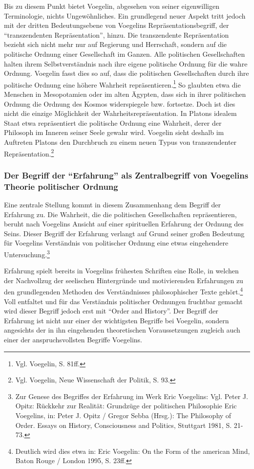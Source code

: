Bis zu diesem Punkt bietet Voegelin, abgesehen von seiner eigenwilligen
Terminologie, nichts Ungewöhnliches. Ein grundlegend neuer Aspekt tritt jedoch
mit der dritten Bedeutungsebene von Voegelins Repräsentationsbegriff, der
"`transzendenten Repräsentation"', hinzu. Die transzendente Repräsentation
bezieht sich nicht mehr nur auf Regierung und Herrschaft, sondern auf die
politische Ordnung einer Gesellschaft im Ganzen. Alle politischen
Gesellschaften halten ihrem Selbstverständnis nach ihre eigene politische
Ordnung für die wahre Ordnung. Voegelin fasst dies so auf, dass die
politischen Gesellschaften durch ihre politische Ordnung eine höhere Wahrheit
repräsentieren.\footnote{Vgl.  Voegelin, S. 81ff.} So glaubten etwa die
Menschen in Mesopotamien oder im alten Ägypten, dass sich in ihrer politischen
Ordnung die Ordnung des Kosmos widerspiegele bzw. fortsetze. Doch ist dies
nicht die einzige Möglichkeit der Wahrheitsrepräsentation. In Platons idealem
Staat etwa repräsentiert die politische Ordnung eine Wahrheit, derer der
Philosoph im Inneren seiner Seele gewahr wird. Voegelin sieht deshalb im
Auftreten Platons den Durchbruch zu einem neuen Typus von transzendenter
Repräsentation.\footnote{Vgl. Voegelin, Neue Wissenschaft der Politik, S. 93.}

\subsubsection{Der Begriff der "`Erfahrung"' als Zentralbegriff von Voegelins
  Theorie politischer Ordnung}

Eine zentrale Stellung kommt in diesem Zusammenhang dem Begriff der Erfahrung
zu. Die Wahrheit, die die politischen Gesellschaften repräsentieren, beruht
nach Voegelins Ansicht auf einer spirituellen Erfahrung der Ordnung des Seins.
Dieser Begriff der Erfahrung verlangt auf Grund seiner großen Bedeutung für
Voegelins Verständnis von politischer Ordnung eine etwas eingehendere
Untersuchung.\footnote{Zur Genese des Begriffes der Erfahrung im Werk Eric
  Voegelins: Vgl. Peter J. Opitz: Rückkehr zur Realität: Grundzüge der
  politischen Philosophie Eric Voegelins, in: Peter J.  Opitz /
  Gregor Sebba (Hrsg.): The Philosophy of Order. Essays on History,
  Consciousness and Politics, Stuttgart 1981, S. 21-73.}

Erfahrung spielt bereits in Voegelins frühesten Schriften eine Rolle, in
welchen der Nachvollzug der seelischen Hintergründe und motivierenden
Erfahrungen zu den grundlegenden Methoden des Verständnisses philosophischer
Texte gehört.\footnote{Deutlich wird dies etwa in: Eric Voegelin: On the Form
  of the american Mind, Baton Rouge / London 1995, S. 23ff.} Voll entfaltet
und für das Verständnis politischer Ordnungen fruchtbar gemacht wird dieser
Begriff jedoch erst mit "`Order and History"'. Der Begriff der Erfahrung ist
nicht nur einer der wichtigsten Begriffe bei Voegelin, sondern angesichts der
in ihn eingehenden theoretischen Voraussetzungen zugleich auch einer der
anspruchsvollsten Begriffe Voegelins.

